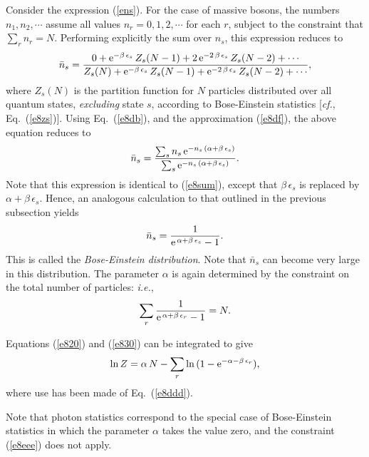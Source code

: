Consider the expression (\ref{ens}). For the case of massive bosons, the numbers
$n_1,n_2, \cdots$ assume all values $n_r=0,1,2,\cdots$ for each $r$, subject to
the constraint that $\sum_r n_r=N$. 
Performing explicitly the sum over $n_s$, this expression reduces to
\begin{equation}
\bar{n}_s=\frac{0 +{\rm e}^{-\beta\,\epsilon_s}\,Z_s(N-1)
+ 2\,{\rm e}^{-2\,\beta\,\epsilon_s}\,Z_s(N-2)+\cdots}
{Z_s(N) +{\rm e}^{-\beta\,\epsilon_s}\,Z_s(N-1)
+ {\rm e}^{-2\,\beta\,\epsilon_s}\,Z_s(N-2)+\cdots},
\end{equation}
where $Z_s(N)$ is the partition function for $N$ particles
distributed over all quantum states, {\em excluding}\/ state $s$, according
to Bose-Einstein statistics [{\em cf.}, Eq.~(\ref{e8zs})]. Using Eq.~(\ref{e8db}),
and the approximation (\ref{e8df}), the above equation reduces to
\begin{equation}
\bar{n}_s = \frac{\sum_s n_s\,{\rm e}^{-n_s\,(\alpha+\beta\,\epsilon_s)}}
{\sum_s {\rm e}^{-n_s\,(\alpha+\beta\,\epsilon_s)}}.
\end{equation}
Note that this expression is identical to (\ref{e8sum}), except that
$\beta\,\epsilon_s$ is replaced by $\alpha+\beta\,\epsilon_s$. Hence,
an analogous calculation to that outlined in the previous subsection yields
\begin{equation}
\bar{n}_s = \frac{1}{{\rm e}^{\,\alpha+\beta\,\epsilon_s}-1}.\label{e8ddd}
\end{equation}
This is called the {\em Bose-Einstein distribution}. Note that $\bar{n}_s$
can become very large in this distribution. The parameter $\alpha$ is again determined
by the constraint on the total number of particles: {\em i.e.},
\begin{equation}
\sum_r
\frac{1}{{\rm e}^{\,\alpha+\beta\,\epsilon_r}-1} =N.\label{e8eee}
\end{equation}


Equations (\ref{e820}) and (\ref{e830}) can be integrated to
give
\begin{equation}
\ln Z = \alpha\,N - \sum_r\ln \,(1-{\rm e}^{-\alpha-\beta\,\epsilon_r}),
\end{equation}
where use has been made of Eq.~(\ref{e8ddd}).

Note that photon statistics correspond to the special case of Bose-Einstein
statistics in which the parameter $\alpha$ takes the value zero,  and the constraint
(\ref{e8eee}) does not apply.

